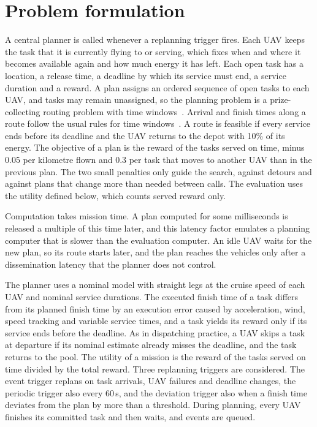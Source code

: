 \section{Problem formulation}\label{sec:problem}
A central planner is called whenever a replanning trigger fires. Each UAV keeps the task that it is currently flying to
or serving, which fixes when and where it becomes available again and how much energy it has left. Each open task has a
location, a release time, a deadline by which its service must end, a service duration and a reward. A plan assigns an
ordered sequence of open tasks to each UAV, and tasks may remain unassigned, so the planning problem is a
prize-collecting routing problem with time windows~\cite{solomon1987algorithms,vansteenwegen2011orienteering}. Arrival
and finish times along a route follow the usual rules for time windows~\cite{savelsbergh1992vrptw}. A route is feasible
if every service ends before its deadline and the UAV returns to the depot with 10\% of its energy. The objective of a
plan is the reward of the tasks served on time, minus 0.05 per kilometre flown and 0.3 per task that moves to another
UAV than in the previous plan. The two small penalties only guide the search, against detours and against plans that
change more than needed between calls. The evaluation uses the utility defined below, which counts served reward only.

Computation takes mission time. A plan computed for some milliseconds is released a multiple of this time later, and
this latency factor emulates a planning computer that is slower than the evaluation computer. An idle UAV waits for the
new plan, so its route starts later, and the plan reaches the vehicles only after a dissemination latency that the
planner does not control.

The planner uses a nominal model with straight legs at the cruise speed of each UAV and nominal service durations. The
executed finish time of a task differs from its planned finish time by an execution error caused by acceleration,
wind, speed tracking and variable service times, and a task yields its reward only if its service ends before the
deadline. As in dispatching practice, a UAV skips a task at departure if its nominal estimate already misses the
deadline, and the task returns to the pool. The utility of a mission is the reward of the tasks served on time divided
by the total reward. Three replanning triggers are considered. The event trigger replans on task arrivals, UAV failures
and deadline changes, the periodic trigger also every 60\,s, and the deviation trigger also when a finish time
deviates from the plan by more than a threshold. During planning, every UAV finishes its committed task and then
waits, and events are queued.
